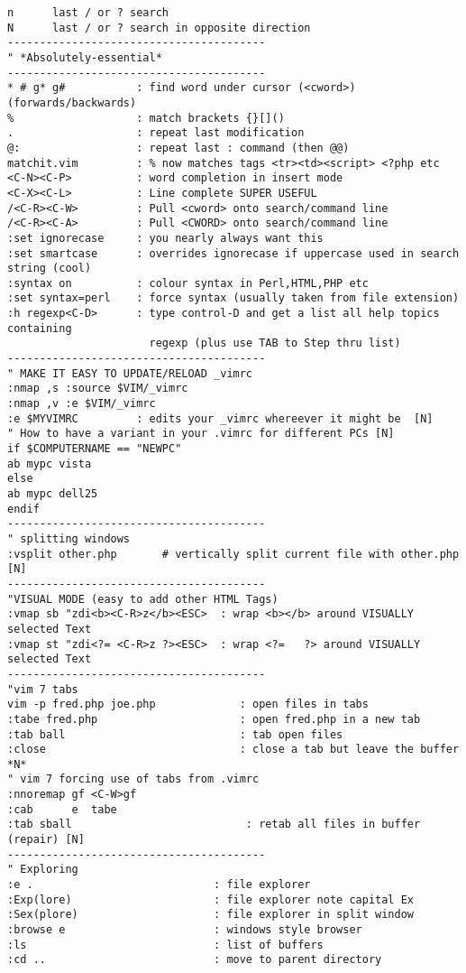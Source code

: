\documentclass[10pt,landscape]{article}
\begin{document}
\begin{multicols}{2}
\begin{verbatim}
n      last / or ? search
N      last / or ? search in opposite direction
----------------------------------------
" *Absolutely-essential*
----------------------------------------
* # g* g#           : find word under cursor (<cword>) (forwards/backwards)
%                   : match brackets {}[]()
.                   : repeat last modification 
@:                  : repeat last : command (then @@)
matchit.vim         : % now matches tags <tr><td><script> <?php etc
<C-N><C-P>          : word completion in insert mode
<C-X><C-L>          : Line complete SUPER USEFUL
/<C-R><C-W>         : Pull <cword> onto search/command line
/<C-R><C-A>         : Pull <CWORD> onto search/command line
:set ignorecase     : you nearly always want this
:set smartcase      : overrides ignorecase if uppercase used in search string (cool)
:syntax on          : colour syntax in Perl,HTML,PHP etc
:set syntax=perl    : force syntax (usually taken from file extension)
:h regexp<C-D>      : type control-D and get a list all help topics containing
                      regexp (plus use TAB to Step thru list)
----------------------------------------
" MAKE IT EASY TO UPDATE/RELOAD _vimrc
:nmap ,s :source $VIM/_vimrc
:nmap ,v :e $VIM/_vimrc
:e $MYVIMRC         : edits your _vimrc whereever it might be  [N]
" How to have a variant in your .vimrc for different PCs [N]
if $COMPUTERNAME == "NEWPC"
ab mypc vista
else
ab mypc dell25
endif
----------------------------------------
" splitting windows
:vsplit other.php       # vertically split current file with other.php [N]
----------------------------------------
"VISUAL MODE (easy to add other HTML Tags)
:vmap sb "zdi<b><C-R>z</b><ESC>  : wrap <b></b> around VISUALLY selected Text
:vmap st "zdi<?= <C-R>z ?><ESC>  : wrap <?=   ?> around VISUALLY selected Text
----------------------------------------
"vim 7 tabs
vim -p fred.php joe.php             : open files in tabs
:tabe fred.php                      : open fred.php in a new tab
:tab ball                           : tab open files
:close                              : close a tab but leave the buffer *N*
" vim 7 forcing use of tabs from .vimrc
:nnoremap gf <C-W>gf
:cab      e  tabe
:tab sball                           : retab all files in buffer (repair) [N]
----------------------------------------
" Exploring
:e .                            : file explorer
:Exp(lore)                      : file explorer note capital Ex
:Sex(plore)                     : file explorer in split window
:browse e                       : windows style browser
:ls                             : list of buffers
:cd ..                          : move to parent directory

\end{verbatim}
\end{multicols}
\end{document}
